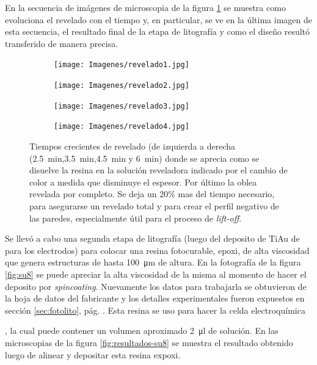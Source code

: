 { 	         En la secuencia de imágenes de microscopia de la figura \ref{fig:revelado} se muestra como evoluciona el revelado con el tiempo y, en particular, se ve en la última imagen de esta secuencia, el resultado final de la etapa de litografía y como el diseño resultó transferido de manera precisa.

 				\begin{figure}[th]
			 	   	    \centering
			 	   	    \begin{subfigure}[t]{0.235\textwidth}
			        	\texttt{[image: Imagenes/revelado1.jpg]}
			       		\end{subfigure}
			     		\begin{subfigure}[t]{0.235\textwidth}
			     		\texttt{[image: Imagenes/revelado2.jpg]}
			    		\end{subfigure}
			     		\begin{subfigure}[t]{0.235\textwidth}
			         	\texttt{[image: Imagenes/revelado3.jpg]}
			        	\end{subfigure}
						\begin{subfigure}[t]{0.235\textwidth}
			     		\texttt{[image: Imagenes/revelado4.jpg]}
			        	\end{subfigure}
			     		\caption[Revelado en función del tiempo]{Tiempos crecientes de revelado (de izquierda  a derecha (\SI{2.5}{min},\SI{3.5}{min},\SI{4.5}{min} y \SI{6}{min}) donde se aprecia como se disuelve la resina en la solución reveladora indicado por el cambio de color a medida que disminuye el espesor. Por último la oblea revelada por completo. Se deja un 20\% mas del tiempo necesario, para asegurarse un revelado total y para crear el perfil negativo de las paredes, especialmente útil para el proceso de\textit{ lift-off}.}
			     		\label{fig:revelado}
			     	   	\end{figure}

 		     Se llevó a cabo una segunda etapa de litografía (luego del deposito de Ti\textbar Au de para los electrodos) para colocar una resina fotocurable, epoxi, de alta viscosidad que genera estructuras de hasta \SI{100}{\um} de altura. En la fotografía de la figura \ref{fig:su8} se puede apreciar la alta viscosidad de la misma al momento de hacer el deposito por \textit{spincoating}. Nuevamente los datos para trabajarla se obtuvieron de la hoja de datos del fabricante\cite{Su8,Microchemicals2014} y los detalles experimentales fueron expuestos en  sección \ref{sec:fotolito}, pág. \pageref{sec:fotolito}. Esta resina se uso para hacer la celda electroquímica}, la cual puede contener un volumen aproximado \SI{2}{\ul} de solución. En las microscopias de la figura \ref{fig:resultados-su8} se muestra el resultado obtenido luego de alinear y depositar esta resina expoxi.

